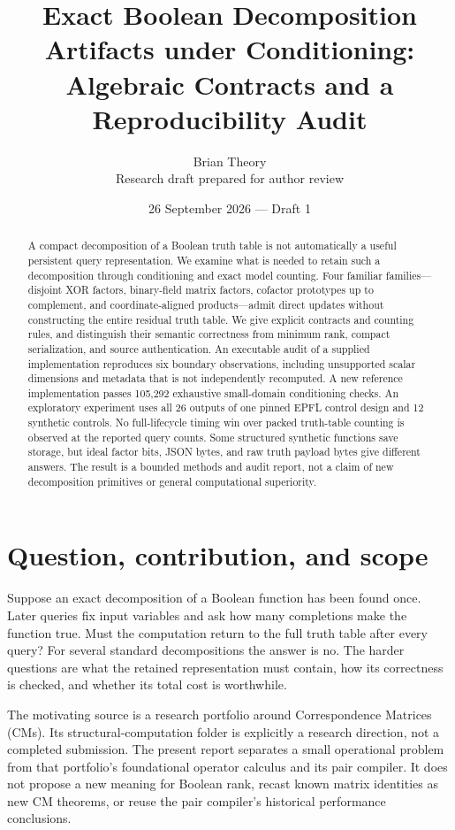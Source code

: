 \documentclass[11pt]{article}
\title{Exact Boolean Decomposition Artifacts under Conditioning:\\Algebraic Contracts and a Reproducibility Audit}
\author{Brian Theory\\\small Research draft prepared for author review}
\date{26 September 2026 --- Draft 1}
\theoremstyle{definition}\newtheorem{definition}[theorem]{Definition}
\theoremstyle{remark}\newtheorem{remark}[theorem]{Remark}
\begin{document}
\maketitle
\begin{abstract}
A compact decomposition of a Boolean truth table is not automatically a useful persistent query representation. We examine what is needed to retain such a decomposition through conditioning and exact model counting. Four familiar families---disjoint XOR factors, binary-field matrix factors, cofactor prototypes up to complement, and coordinate-aligned products---admit direct updates without constructing the entire residual truth table. We give explicit contracts and counting rules, and distinguish their semantic correctness from minimum rank, compact serialization, and source authentication. An executable audit of a supplied implementation reproduces six boundary observations, including unsupported scalar dimensions and metadata that is not independently recomputed. A new reference implementation passes 105,292 exhaustive small-domain conditioning checks. An exploratory experiment uses all 26 outputs of one pinned EPFL control design and 12 synthetic controls. No full-lifecycle timing win over packed truth-table counting is observed at the reported query counts. Some structured synthetic functions save storage, but ideal factor bits, JSON bytes, and raw truth payload bytes give different answers. The result is a bounded methods and audit report, not a claim of new decomposition primitives or general computational superiority.
\end{abstract}

\section{Question, contribution, and scope}
\label{sec:scope}
Suppose an exact decomposition of a Boolean function has been found once. Later queries fix input variables and ask how many completions make the function true. Must the computation return to the full truth table after every query? For several standard decompositions the answer is no. The harder questions are what the retained representation must contain, how its correctness is checked, and whether its total cost is worthwhile.

The motivating source is a research portfolio around Correspondence Matrices (CMs)\cite{archive}. Its structural-computation folder is explicitly a research direction, not a completed submission. The present report separates a small operational problem from that portfolio's foundational operator calculus and its pair compiler. It does not propose a new meaning for Boolean rank, recast known matrix identities as new CM theorems, or reuse the pair compiler's historical performance conclusions.
\end{document}
